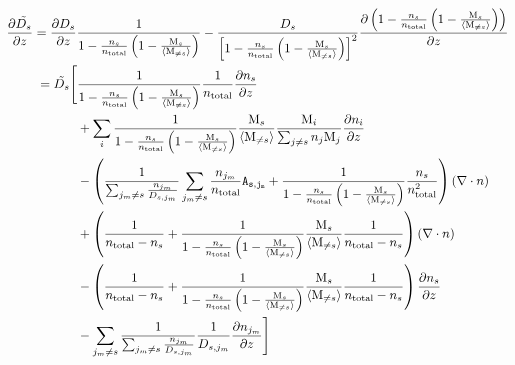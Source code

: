 \begin{equation}
\begin{split}
\doverdz{\tilde{\diff_s}}   & = \doverdz{\diff_s}\frac{1}{1-\frac{\conc_s}{\concAtm}\left(1 - \frac{\Mm_s}{\mean{\Mm_{\neq s}}}\right)}
                              - \frac{\diff_s}{\left[1-\frac{\conc_s}{\concAtm}\left(1 - \frac{\Mm_s}{\mean{\Mm_{\neq s}}}\right)\right]^2}
                                \dOverdz{1-\frac{\conc_s}{\concAtm}\left(1 - \frac{\Mm_s}{\mean{\Mm_{\neq s}}}\right)}\\
                            & \;\;
                                 \begin{split} 
                                    = \tilde{\diff_s}\Bigg[
                            &   \frac{1}{1-\frac{\conc_s}{\concAtm}  \left(1 - \frac{\Mm_s}{\mean{\Mm_{\neq s}}}\right)}
                                                        \frac{1}{\concAtm}\doverdz{\conc_s} \\
                            &  + \sum_i
                                    \frac{1}{1-\frac{\conc_s}{\concAtm}  \left(1 - \frac{\Mm_s}{\mean{\Mm_{\neq s}}}\right)}
                                      \frac{\Mm_s}{\mean{\Mm_{\neq s}}}\frac{\Mm_i}{\sum_{j\neq s}\conc_j\Mm_j}\doverdz{\conc_i} \\
                            & - \left(\frac{1}{\sum_{j_m \neq s}\frac{\conc_{j_m}}{\diff_{s,j_m}}}
                                       \sum_{j_m \neq s}\frac{\conc_{j_m}}{\concAtm}\A 
                              + \frac{1}{1-\frac{\conc_s}{\concAtm}  \left(1 - \frac{\Mm_s}{\mean{\Mm_{\neq s}}}\right)}
                                        \frac{\conc_s}{\concAtm^2}\right)\diverge{\conc} \\
                            & + \left( \frac{1}{\concAtm - \conc_s}
                                 + \frac{1}{1-\frac{\conc_s}{\concAtm}  \left(1 - \frac{\Mm_s}{\mean{\Mm_{\neq s}}}\right)}
                                      \frac{\Mm_s}{\mean{\Mm_{\neq s}}}\frac{1}{\concAtm - \conc_s}\right)\diverge{\conc} \\
                            & - \left( \frac{1}{\concAtm - \conc_s}
                                 + \frac{1}{1-\frac{\conc_s}{\concAtm}  \left(1 - \frac{\Mm_s}{\mean{\Mm_{\neq s}}}\right)}
                                      \frac{\Mm_s}{\mean{\Mm_{\neq s}}}\frac{1}{\concAtm - \conc_s}\right)\doverdz{\conc_s} \\
                            & - \sum_{j_m \neq s}\frac{1}{\sum_{j_m \neq s}\frac{\conc_{j_m}}{\diff_{s,j_m}}}
                                 \frac{1}{\diff_{s,j_m}}\doverdz{\conc_{j_m}}\Bigg]
                                 \end{split} 
\end{split}
\end{equation}

